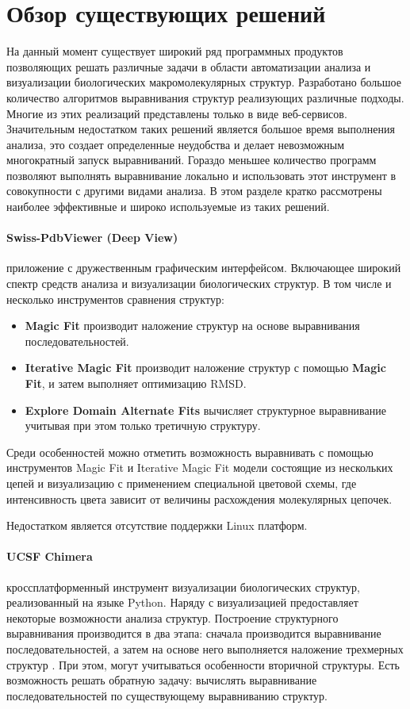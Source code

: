 \documentclass[a4paper, 12pt, titlepage, utf8]{extarticle}
\let\oldsection\section         %
\renewcommand{\section}{\newpage\oldsection}
\begin{document}
\section{Обзор существующих решений}
На данный момент существует широкий ряд программных продуктов позволяющих решать различные задачи в области автоматизации анализа и визуализации биологических макромолекулярных структур. Разработано большое количество алгоритмов выравнивания структур реализующих различные подходы. Многие из этих реализаций представлены только в виде веб-сервисов. Значительным недостатком таких решений является большое время выполнения анализа, это создает определенные неудобства и делает невозможным многократный запуск выравниваний. Гораздо меньшее количество программ позволяют выполнять выравнивание локально и использовать этот инструмент в совокупности с другими видами анализа. В этом разделе кратко рассмотрены наиболее эффективные и широко используемые из таких решений.

\paragraph{Swiss-PdbViewer (Deep View) \cite{deep-view}}
приложение с дружественным графическим интерфейсом. Включающее широкий спектр средств анализа и визуализации биологических структур. В том числе и несколько инструментов сравнения структур:
\begin{itemize}
    \item \textbf{Magic Fit} производит наложение структур на основе выравнивания последовательностей.
    \item \textbf{Iterative Magic Fit} производит наложение структур с помощью \textbf{Magic Fit}, и затем выполняет оптимизацию RMSD.
    \item \textbf{Explore Domain Alternate Fits} вычисляет структурное выравнивание учитывая при этом только третичную структуру.
\end{itemize}

Среди особенностей можно отметить возможность выравнивать с помощью инструментов Magic Fit и Iterative Magic Fit модели состоящие из нескольких цепей и визуализацию с применением специальной цветовой схемы, где интенсивность цвета зависит от величины расхождения молекулярных цепочек.

Недостатком является отсутствие поддержки Linux платформ.

\paragraph{UCSF Chimera \cite{chimera}}
кроссплатформенный инструмент визуализации биологических структур, реализованный на языке Python. Наряду с визуализацией предоставляет некоторые возможности анализа структур. Построение структурного выравнивания производится в два этапа: сначала производится выравнивание последовательностей, а затем на основе него выполняется наложение трехмерных структур \cite{chimera-alignment}. При этом, могут учитываться особенности вторичной структуры. Есть возможность решать обратную задачу: вычислять выравнивание последовательностей по существующему выравниванию структур.
\end{document}
